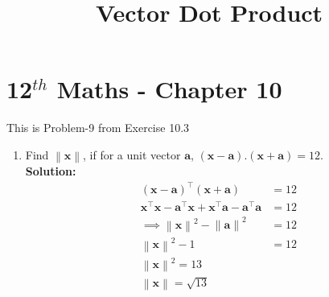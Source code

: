 \documentclass[12pt]{article}
\providecommand{\brak}[1]{\ensuremath{\left(#1\right)}}
\providecommand{\norm}[1]{\left\lVert#1\right\rVert}
\newcommand{\solution}{\noindent \textbf{Solution: }}
\let\vec\mathbf
\begin{document}
\begin{center}
\title{\textbf{Vector Dot Product}}
\date{\vspace{-5ex}} %
\maketitle
\end{center}
\setcounter{page}{1}

\section{12$^{th}$ Maths - Chapter 10}
This is Problem-9 from Exercise 10.3
\begin{enumerate}
\item Find $\norm{\vec{x}}$, if for a unit vector $\vec{a}$, $\brak{\vec{x}-\vec{a}}.\brak{\vec{x}+\vec{a}} = 12$.\\
\solution 
\begin{align}
  \label{eq:det2f}
  \brak{\vec{x}-\vec{a}}^\top\brak{\vec{x}+\vec{a}} &= 12 \\
  \vec{x}^\top\vec{x} - \vec{a}^\top\vec{x} + \vec{x}^\top\vec{a} - \vec{a}^\top\vec{a} &= 12 \\
  \implies \norm{\vec{x}}^{2} - \norm{\vec{a}}^{2} &= 12 \\
  \norm{\vec{x}}^{2} - 1 &= 12  \\
  \norm{\vec{x}}^{2} = 13 \\
  \norm{\vec{x}} = \sqrt{13}
\end{align}
\end{enumerate}
\end{document}
